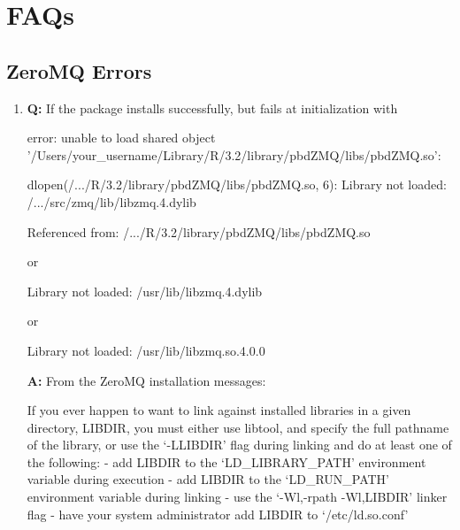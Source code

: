 
\section[FAQs]{FAQs}
\label{sec:faqs}


\subsection[ZeroMQ Errors]{ZeroMQ Errors}
\label{sec:zmq_errors}


\begin{enumerate}
\item {\bf\color{blue} Q:}
      If the package installs successfully, but fails at initialization with
\begin{Error}
error: unable to load shared object
'/Users/your_username/Library/R/3.2/library/pbdZMQ/libs/pbdZMQ.so':

dlopen(/.../R/3.2/library/pbdZMQ/libs/pbdZMQ.so, 6):
Library not loaded: /.../src/zmq/lib/libzmq.4.dylib

Referenced from: /.../R/3.2/library/pbdZMQ/libs/pbdZMQ.so
\end{Error}
or
\begin{Error}
Library not loaded: /usr/lib/libzmq.4.dylib
\end{Error}
or
\begin{Error}
Library not loaded: /usr/lib/libzmq.so.4.0.0
\end{Error}
      {\bf\color{blue} A:}
      From the ZeroMQ installation messages:
\begin{Code}
If you ever happen to want to link against installed libraries
in a given directory, LIBDIR, you must either use libtool, and
specify the full pathname of the library, or use the `-LLIBDIR'
flag during linking and do at least one of the following:
   - add LIBDIR to the `LD_LIBRARY_PATH' environment variable
     during execution
   - add LIBDIR to the `LD_RUN_PATH' environment variable
     during linking
   - use the `-Wl,-rpath -Wl,LIBDIR' linker flag
   - have your system administrator add LIBDIR to `/etc/ld.so.conf'


\end{Code}
\end{enumerate}
